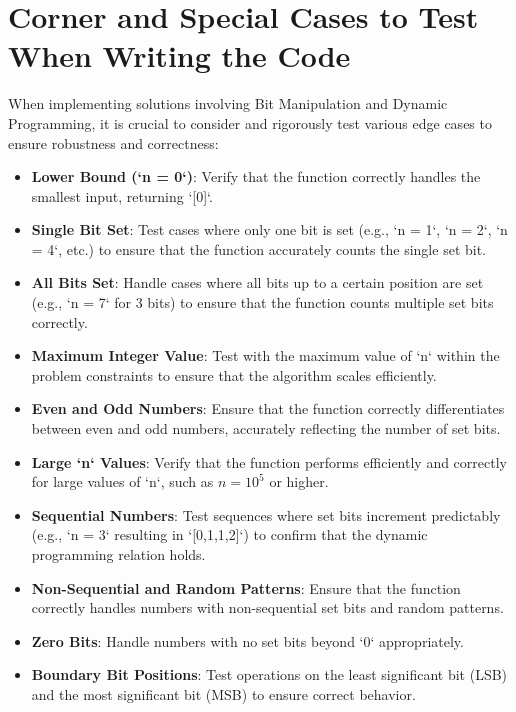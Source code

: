 \section*{Corner and Special Cases to Test When Writing the Code}

When implementing solutions involving Bit Manipulation and Dynamic Programming, it is crucial to consider and rigorously test various edge cases to ensure robustness and correctness:

\begin{itemize}
    \item \textbf{Lower Bound (`n = 0`)}: Verify that the function correctly handles the smallest input, returning `[0]`.
    
    \item \textbf{Single Bit Set}: Test cases where only one bit is set (e.g., `n = 1`, `n = 2`, `n = 4`, etc.) to ensure that the function accurately counts the single set bit.
    
    \item \textbf{All Bits Set}: Handle cases where all bits up to a certain position are set (e.g., `n = 7` for 3 bits) to ensure that the function counts multiple set bits correctly.
    
    \item \textbf{Maximum Integer Value}: Test with the maximum value of `n` within the problem constraints to ensure that the algorithm scales efficiently.
    
    \item \textbf{Even and Odd Numbers}: Ensure that the function correctly differentiates between even and odd numbers, accurately reflecting the number of set bits.
    
    \item \textbf{Large `n` Values}: Verify that the function performs efficiently and correctly for large values of `n`, such as \(n = 10^5\) or higher.
    
    \item \textbf{Sequential Numbers}: Test sequences where set bits increment predictably (e.g., `n = 3` resulting in `[0,1,1,2]`) to confirm that the dynamic programming relation holds.
    
    \item \textbf{Non-Sequential and Random Patterns}: Ensure that the function correctly handles numbers with non-sequential set bits and random patterns.
    
    \item \textbf{Zero Bits}: Handle numbers with no set bits beyond `0` appropriately.
    
    \item \textbf{Boundary Bit Positions}: Test operations on the least significant bit (LSB) and the most significant bit (MSB) to ensure correct behavior.
\end{itemize}

